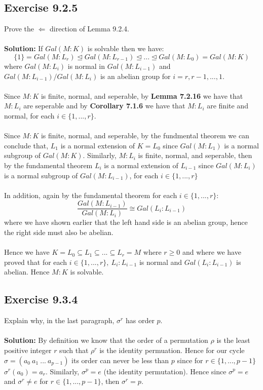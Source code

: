 \documentclass{article}
\begin{document}
\subsection*{Exercise 9.2.5}
Prove the $\Longleftarrow$ direction of Lemma 9.2.4.
\\\\
\textbf{Solution:}
If $Gal(M:K)$ is solvable then we have:
\[\{1\} = Gal(M:L_r) \unlhd Gal(M:L_{r-1}) \unlhd ... \unlhd Gal(M:L_0) = Gal(M:K) \]
where $Gal(M:L_{i})$ is normal in $Gal(M:L_{i-1})$  and $Gal(M:L_{i-1})/Gal(M:L_{i})$ is an abelian group for $i=r, r-1, ..., 1$.
\\\\
Since $M:K$ is finite, normal, and seperable, by \textbf{Lemma 7.2.16} we have that $M:L_i$ are seperable and by \textbf{Corollary 7.1.6}
we have that $M:L_i$ are finite and normal, for each $i \in \{ 1, ..., r\}$.
\\\\
Since $M:K$ is finite, normal, and seperable, by the fundmental theorem we can conclude that,
$L_1$ is a normal extension of $K=L_0$ since $Gal(M:L_1)$ is a normal subgroup of $Gal(M:K)$.
Similarly, $M:L_i$ is finite, normal, and seperable, then by the fundamental theorem $L_i$ is a normal extension of $L_{i-1}$ since $Gal(M:L_i)$ is a normal subgroup of $Gal(M:L_{i-1})$,
for each $i \in \{1,..., r\}$
\\\\
In addition, again by the fundamental theorem for each $i \in \{1,...,r\}$:
\[ \frac{Gal(M:L_{i-1})}{Gal(M:L_{i})} \cong Gal(L_i:L_{i-1})\]
where we have shown earlier that the left hand side is an abelian group, hence the right side must also
be abelian.
\\\\
Hence we have $K=L_0 \subseteq L_1 \subseteq ... \subseteq L_r = M$ where $r \ge 0$ and 
where we have proved that for each $i \in \{1,...,r\}, \ L_i:L_{i-1}$ is normal and $Gal(L_i:L_{i-1})$ is abelian.
Hence $M:K$ is solvable. 

\subsection*{Exercise 9.3.4}
Explain why, in the last paragraph, $\sigma^r$ has order $p$.
\\\\
\textbf{Solution:}
By definition we know that the order of a permutation $\rho$ is the least positive integer $r$ such that $\rho^r$ is the identity permuation.
Hence for our cycle $\sigma = (a_0 \ a_1 \ ... \ a_{p-1})$ its order can never be less than $p$ since for $r \in \{1,...,p-1\}$ $\sigma^r(a_0) = a_r$.
Similarly, $\sigma^p = e$ (the identity permutation).
Hence since $\sigma^p = e$ and $\sigma^r \neq e$ for $r \in\{1,...,p-1\}$, then $\sigma^r = p$.
\end{document}
